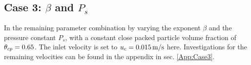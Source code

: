 








\subsection{Case 3: $\beta$ and $P_s$}
\label{sec:case3}
In the remaining parameter combination by varying the exponent $\beta$ and the pressure constant $P_s$, with a constant close packed particle volume fraction of $\theta_{cp} = 0.65$.
The inlet velocity is set to $u_c = 0.015 \operatorname{m/s}$ here. Investigations for the remaining velocities can be found in the appendix in sec. \ref{App:Case3}.


